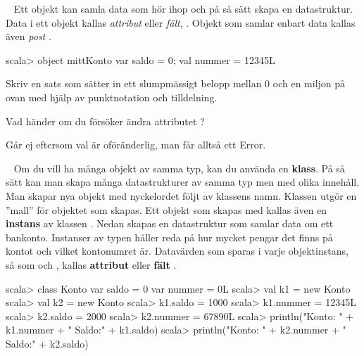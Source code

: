 \Task  \what~  Ett objekt kan samla data som hör ihop och på så sätt skapa en datastruktur. Data i ett objekt kallas \emph{attribut} eller \emph{fält}, . Objekt som samlar enbart data kallas även \emph{post} .
\begin{REPLnonum}
scala> object mittKonto { var saldo = 0; val nummer = 12345L }
\end{REPLnonum}
\Subtask Skriv en sats som sätter in ett slumpmässigt belopp mellan 0 och en miljon på  ovan med hjälp av punktnotation och tilldelning.

\Subtask Vad händer om du försöker ändra attributet ?

\SOLUTION


\TaskSolved \what


\SubtaskSolved   {}

\SubtaskSolved   Går ej eftersom val är oföränderlig, man får alltså ett Error.


\QUESTEND









\QUESTBEGIN

\Task  \what~  Om du vill ha många objekt av samma typ, kan du använda en \textbf{klass}. På så sätt kan man skapa många datastrukturer av samma typ men med olika innehåll. Man skapar nya objekt med nyckelordet  följt av klassens namn. Klassen utgör en ''mall'' för objektet som skapas. Ett objekt som skapas med  kallas även en \textbf{instans} av klassen . Nedan skapas en datastruktur  som samlar data om ett bankonto. Instanser av typen  håller reda på hur mycket pengar det finns på kontot och vilket kontonumret är. Datavärden som sparas i varje objektinstans, så som  och , kallas \textbf{attribut}  eller \textbf{fält} .

\begin{REPL}
scala> class Konto {
         var saldo = 0
         var nummer = 0L
       }
scala> val k1 = new Konto
scala> val k2 = new Konto
scala> k1.saldo = 1000
scala> k1.nummer = 12345L
scala> k2.saldo = 2000
scala> k2.nummer = 67890L
scala> println("Konto: " + k1.nummer + " Saldo:" + k1.saldo)
scala> println("Konto: " + k2.nummer + " Saldo:" + k2.saldo)
\end{REPL}

